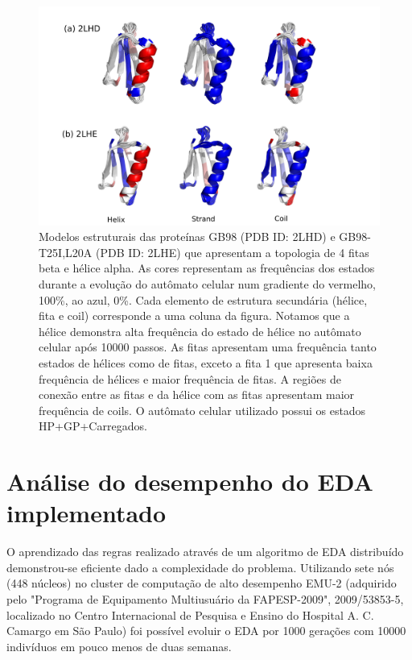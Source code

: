 \begin{figure}
  \centering
  \includegraphics[width=1\textwidth]{figures/camel_2lhd_2lhe.pdf}
  \caption{Modelos estruturais das proteínas GB98 (PDB ID: 2LHD) e GB98-T25I,L20A (PDB ID: 2LHE) que apresentam a topologia de 4 fitas beta e hélice alpha. As cores representam as frequências dos estados durante a evolução do autômato celular num gradiente do vermelho, 100\%, ao azul, 0\%. Cada elemento de estrutura secundária (hélice, fita e coil) corresponde a uma coluna da figura. Notamos que a hélice demonstra alta frequência do estado de hélice no autômato celular após 10000 passos. As fitas apresentam uma frequência tanto estados de hélices como de fitas, exceto a fita 1 que apresenta baixa frequência de hélices e maior frequência de fitas. A regiões de conexão entre as fitas e da hélice com as fitas apresentam maior frequência de coils. O autômato celular utilizado possui os estados HP+GP+Carregados.}
        \label{fig:camel_2lhd_2lhe}
\end{figure}


\section{Análise do desempenho do EDA implementado}

O aprendizado das regras realizado através de um algoritmo de EDA distribuído demonstrou-se eficiente dado a complexidade do problema. Utilizando sete nós (448 núcleos) no cluster de computação de alto desempenho EMU-2 (adquirido pelo "Programa de Equipamento  Multiusuário da FAPESP-2009", 2009/53853-5, localizado no Centro Internacional de Pesquisa e Ensino do Hospital A. C. Camargo em  São Paulo) foi possível evoluir o EDA por 1000 gerações com 10000 indivíduos em pouco menos de duas semanas.

